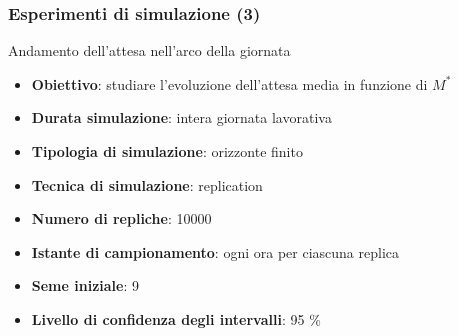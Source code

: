 \documentclass[
	usepdftitle=false,
	xcolor={table, dvipsnames},
	hyperref={
		pdftitle={Studio delle prestazioni di un Ufficio Postale ispirato a Poste Italiane},
    	pdfauthor={A. Chillotti, C. Cuffaro e S. Tiberi}
    }
]{beamer}
\begin{document}
\begin{frame}
\frametitle{Esperimenti di simulazione (3)}
\begin{block}{Andamento dell'attesa nell'arco della giornata}
\begin{itemize}
\item \textbf{Obiettivo}: studiare l'evoluzione dell'attesa media in funzione di $M^*$
\item \textbf{Durata simulazione}: intera giornata lavorativa
\item \textbf{Tipologia di simulazione}: orizzonte finito
\item \textbf{Tecnica di simulazione}: replication
\item \textbf{Numero di repliche}: 10000
\item \textbf{Istante di campionamento}: ogni ora per ciascuna replica
\item \textbf{Seme iniziale}: 9
\item \textbf{Livello di confidenza degli intervalli}: 95 \%
\end{itemize}
\end{block}
\end{frame}
\end{document}
